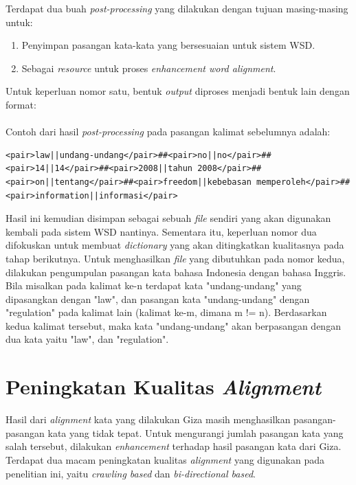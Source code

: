 Terdapat dua buah \textit{post-processing} yang dilakukan dengan tujuan masing-masing untuk:

\begin{enumerate}
	\item Penyimpan pasangan kata-kata yang bersesuaian untuk sistem WSD.
	\item Sebagai \textit{resource} untuk proses \textit{enhancement word alignment}.
\end{enumerate}


Untuk keperluan nomor satu, bentuk \textit{output} diproses menjadi bentuk lain dengan format:\\

\noindent{}\\


Contoh dari hasil \textit{post-processing} pada pasangan kalimat sebelumnya adalah:

\begin{lstlisting}[backgroundcolor = \color{white}]
<pair>law||undang-undang</pair>##<pair>no||no</pair>##<pair>14||14</pair>##<pair>2008||tahun 2008</pair>##<pair>on||tentang</pair>##<pair>freedom||kebebasan memperoleh</pair>##<pair>information||informasi</pair>
\end{lstlisting}

Hasil ini kemudian disimpan sebagai sebuah \textit{file} sendiri yang akan digunakan kembali pada sistem WSD nantinya. Sementara itu, keperluan nomor dua difokuskan untuk membuat \textit{dictionary} yang akan ditingkatkan kualitasnya pada tahap berikutnya. Untuk menghasilkan \textit{file} yang dibutuhkan pada nomor kedua, dilakukan pengumpulan pasangan kata bahasa Indonesia dengan bahasa Inggris. Bila misalkan pada kalimat ke-n terdapat kata "undang-undang" yang dipasangkan dengan "law", dan pasangan kata "undang-undang" dengan "regulation" pada kalimat lain (kalimat ke-m, dimana m != n). Berdasarkan kedua kalimat tersebut, maka kata "undang-undang" akan berpasangan dengan dua kata yaitu "law", dan "regulation".

\section{Peningkatan Kualitas \textit{Alignment}}

Hasil dari \textit{alignment} kata yang dilakukan Giza masih menghasilkan pasangan-pasangan kata yang tidak tepat. Untuk mengurangi jumlah pasangan kata yang salah tersebut, dilakukan \textit{enhancement} terhadap hasil pasangan kata dari Giza. Terdapat dua macam peningkatan kualitas \textit{alignment} yang digunakan pada penelitian ini, yaitu \textit{crawling based} dan \textit{bi-directional based}.

